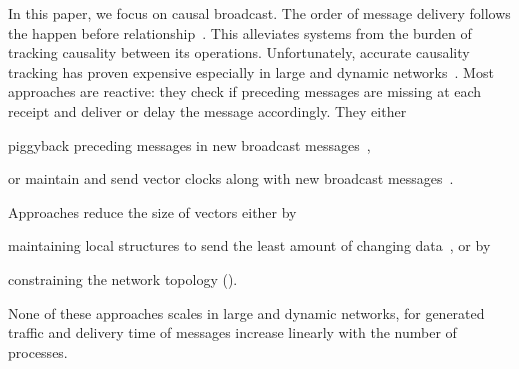 In this paper, we focus on causal broadcast. The order of message delivery
follows the happen before
relationship~\cite{lamport1978time,schwarz1994detecting}. This alleviates
systems from the burden of tracking causality between its operations.
Unfortunately, accurate causality tracking has proven expensive especially in
large and dynamic networks~\cite{charronbost1991concerning}. Most approaches are
reactive: they check if preceding messages are missing at each receipt and
deliver or delay the message accordingly. They either
\begin{inparaenum}[(i)]
\item piggyback preceding messages in new broadcast
  messages~\cite{birman1987reliable,hadzilacos1993fault},
\item or maintain and send vector clocks along with new broadcast
  messages~\cite{fidge1988timestamps,mattern1989virtual}.
\end{inparaenum}
Approaches reduce the size of vectors either by
\begin{inparaenum}[(a)]
\item maintaining local structures to send the least amount of changing
  data~\cite{singhal1992efficient}, or by
\item constraining the network topology (\REF).
\end{inparaenum}
None of these approaches scales in large and dynamic networks, for
generated traffic and delivery time of messages increase linearly with the
number of processes.

